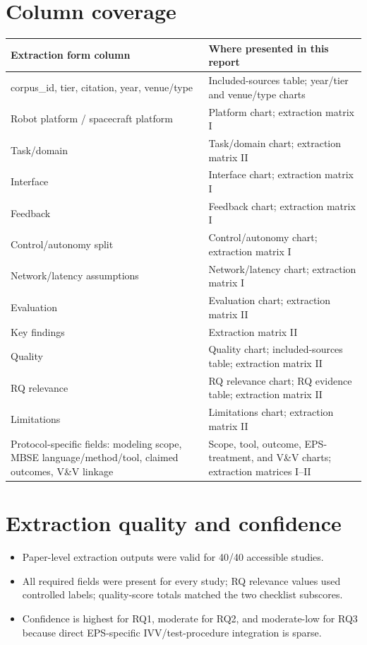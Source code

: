 \documentclass[10pt]{article}
\begin{document}
\section*{Column coverage}
\begin{center}
\small
\begin{tabular}{p{5.2cm}p{9.2cm}}
\toprule
Extraction form column & Where presented in this report\\
\midrule
corpus\_id, tier, citation, year, venue/type & Included-sources table; year/tier and venue/type charts\\
Robot platform / spacecraft platform & Platform chart; extraction matrix I\\
Task/domain & Task/domain chart; extraction matrix II\\
Interface & Interface chart; extraction matrix I\\
Feedback & Feedback chart; extraction matrix I\\
Control/autonomy split & Control/autonomy chart; extraction matrix I\\
Network/latency assumptions & Network/latency chart; extraction matrix I\\
Evaluation & Evaluation chart; extraction matrix II\\
Key findings & Extraction matrix II\\
Quality & Quality chart; included-sources table; extraction matrix II\\
RQ relevance & RQ relevance chart; RQ evidence table; extraction matrix II\\
Limitations & Limitations chart; extraction matrix II\\
Protocol-specific fields: modeling scope, MBSE language/method/tool, claimed outcomes, V\&V linkage & Scope, tool, outcome, EPS-treatment, and V\&V charts; extraction matrices I--II\\
\bottomrule
\end{tabular}
\end{center}

\section*{Extraction quality and confidence}
\begin{itemize}
\item Paper-level extraction outputs were valid for 40/40 accessible studies.
\item All required fields were present for every study; RQ relevance values used controlled labels; quality-score totals matched the two checklist subscores.
\item Confidence is highest for RQ1, moderate for RQ2, and moderate-low for RQ3 because direct EPS-specific IVV/test-procedure integration is sparse.
\end{itemize}

\nocite{*}
\printbibliography[title={Sources}]
\end{document}
